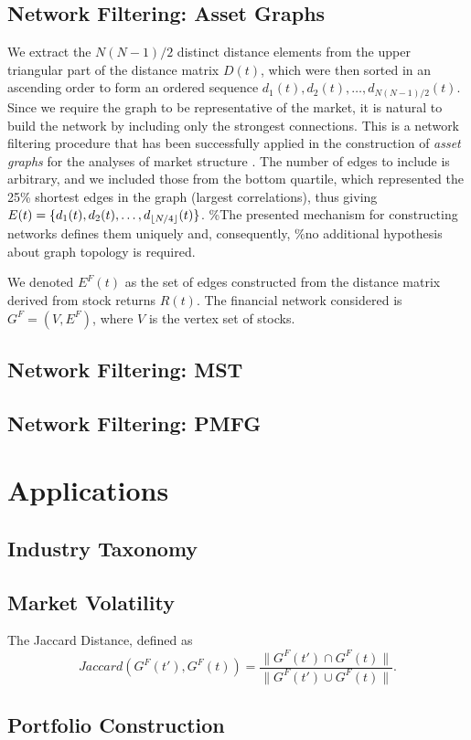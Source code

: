 \documentclass[]{book}
\theoremstyle{definition}
\theoremstyle{definition}
\theoremstyle{definition}
\theoremstyle{remark}
\begin{document}
\subsection{Network Filtering: Asset
Graphs}\label{network-filtering-asset-graphs}

We extract the \(N(N-1)/2\) distinct distance elements from the upper
triangular part of the distance matrix \(D(t)\), which were then sorted
in an ascending order to form an ordered sequence
\(d_1(t), d_2(t), \ldots, d_{N(N-1)/2}(t)\). Since we require the graph
to be representative of the market, it is natural to build the network
by including only the strongest connections. This is a network filtering
procedure that has been successfully applied in the construction of
\textit{asset graphs} for the analyses of market structure
\cite{1402-4896-2003-T106-011, refId0-Onnela-2004}. The number of edges
to include is arbitrary, and we included those from the bottom quartile,
which represented the 25\% shortest edges in the graph (largest
correlations), thus giving
\(E(t) = \{d_1(t), d_2(t), \ldots, d_{\lfloor N/4\rfloor}(t)\}\). \%The
presented mechanism for constructing networks defines them uniquely and,
consequently, \%no additional hypothesis about graph topology is
required.

We denoted \(E^{F}(t)\) as the set of edges constructed from the
distance matrix derived from stock returns \(R(t)\). The financial
network considered is \(G^{F} = ( V, E^{F} )\), where \(V\) is the
vertex set of stocks.

\subsection{Network Filtering: MST}\label{network-filtering-mst}

\subsection{Network Filtering: PMFG}\label{network-filtering-pmfg}

\section{Applications}\label{applications}

\subsection{Industry Taxonomy}\label{industry-taxonomy}

\subsection{Market Volatility}\label{market-volatility}

The Jaccard Distance, defined as
\[ Jaccard(G^{F}(t'), G^{F}(t)) = \frac{\|G^{F}(t') \cap G^{F}(t)\|}{\|G^{F}(t') \cup G^{F}(t)\|}.\]

\subsection{Portfolio Construction}\label{portfolio-construction}


\end{document}
